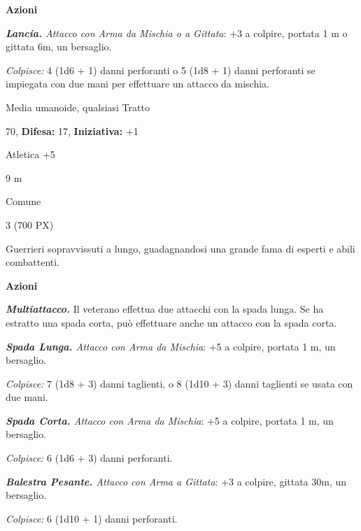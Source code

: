 \begin{multicols}{2}
{\textbf{Azioni}

\emph{\textbf{Lancia.} Attacco con Arma da Mischia o a Gittata}: +3 a colpire, portata 1 m o gittata 6m, un bersaglio.

\emph{Colpisce:} 4 (1d6 + 1) danni perforanti o 5 (1d8 + 1) danni perforanti se impiegata con due mani per effettuare un attacco da mischia.

\begin{description}[noitemsep, topsep=0pt, parsep=0pt, partopsep=0pt, leftmargin=0cm, labelwidth=2.2cm]
    \item[\textbf{Taglia/Tipo:}] Media umanoide, qualsiasi Tratto
    \item[\textbf{Caratt.:}] 
    \item[\textbf{Punti Ferita:}] 70,  \textbf{Difesa:} 17,  \textbf{Iniziativa:} +1
    \item[\textbf{Comp.:}] Atletica +5
    \item[\textbf{Tiri Salvez.:}] 
    \item[\textbf{Movimento:}] 9 m
    \item[\textbf{Linguaggi:}] Comune
    \item[\textbf{Sfida:}] 3 (700 PX)\smallskip
\end{description}

Guerrieri sopravvissuti a lungo, guadagnandosi una grande fama di esperti e abili combattenti.

\textbf{Azioni}

\emph{\textbf{Multiattacco.}} Il veterano effettua due attacchi con la spada lunga. Se ha estratto una spada corta, può effettuare anche un attacco con la spada corta.

\emph{\textbf{Spada Lunga.} Attacco con Arma da Mischia}: +5 a colpire, portata 1 m, un bersaglio.

\emph{Colpisce:} 7 (1d8 + 3) danni taglienti, o 8 (1d10 + 3) danni taglienti se usata con due mani.

\emph{\textbf{Spada Corta.} Attacco con Arma da Mischia}: +5 a colpire, portata 1 m, un bersaglio.

\emph{Colpisce:} 6 (1d6 + 3) danni perforanti.

\emph{\textbf{Balestra Pesante.} Attacco con Arma a Gittata}: +3 a colpire, gittata 30m, un bersaglio.

\emph{Colpisce:} 6 (1d10 + 1) danni perforanti.

}
\end{multicols}
